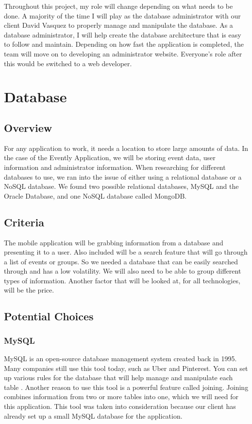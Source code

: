 \documentclass[onecolumn, draftclsnofoot,10pt, compsoc]{IEEEtran}
\begin{document}
Throughout this project, my role will change depending on what needs to be done. A majority of the time I will play as the database administrator with our client David Vasquez to properly manage and manipulate the database. As a database administrator, I will help create the database architecture that is easy to follow and maintain. Depending on how fast the application is completed, the team will move on to developing an administrator website. Everyone's role after this would be switched to a web developer.

\section{Database}
\subsection{Overview}

For any application to work, it needs a location to store large amounts of data. In the case of the Evently Application, we will be storing event data, user information and administrator information. When researching for different databases to use, we ran into the issue of either using a relational database or a NoSQL database. We found two possible relational databases, MySQL and the Oracle Database, and one NoSQL database called MongoDB.

\subsection{Criteria}

The mobile application will be grabbing information from a database and presenting it to a user. Also included will be a search feature that will go through a list of events or groups. So we needed a database that can be easily searched through and has a low volatility. We will also need to be able to group different types of information. Another factor that will be looked at, for all technologies, will be the price.

\subsection{Potential Choices}
\subsubsection{MySQL}

MySQL is an open-source database management system created back in 1995. Many companies still use this tool today, such as Uber and Pinterest. You can set up various rules for the database that will help manage and manipulate each table \cite{MySQL}. Another reason to use this tool is a powerful feature called joining. Joining combines information from two or more tables into one, which we will need for this application. This tool was taken into consideration because our client has already set up a small MySQL database for the application.
\end{document}
